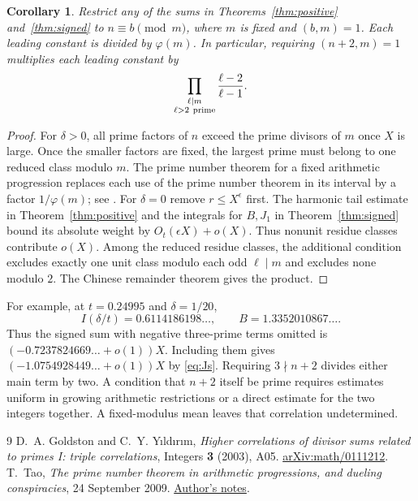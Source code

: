 \documentclass[11pt]{article}
\newtheorem{corollary}[theorem]{Corollary}
\begin{document}
\begin{corollary}\label{cor:local}
Restrict any of the sums in Theorems~\ref{thm:positive}
and~\ref{thm:signed} to \(n\equiv b\pmod m\), where \(m\) is fixed
and \((b,m)=1\). Each leading constant is divided by \(\varphi(m)\).
In particular, requiring \((n+2,m)=1\) multiplies each leading
constant by
\[
       \prod_{\substack{\ell\mid m\\\ell>2\ {\rm prime}}}
                     \frac{\ell-2}{\ell-1}.
\]
\end{corollary}
\begin{proof}
For \(\delta>0\), all prime factors of \(n\) exceed the prime divisors
of \(m\) once \(X\) is large. Once the smaller factors are fixed, the
largest prime must belong to one reduced class modulo \(m\).
The prime number theorem for a fixed arithmetic progression replaces
each use of the prime number theorem in its interval by a factor
\(1/\varphi(m)\); see \cite{Tao}. For \(\delta=0\) remove \(r\le
X^\epsilon\) first. The harmonic tail estimate in
Theorem~\ref{thm:positive} and the integrals for \(B,J_1\) in
Theorem~\ref{thm:signed} bound its absolute weight by
\(O_t(\epsilon X)+o(X)\). Thus nonunit residue classes contribute
\(o(X)\). Among the reduced residue classes, the additional
condition excludes exactly one unit class modulo each odd
\(\ell\mid m\) and excludes none modulo \(2\). The Chinese
remainder theorem gives the product.
\end{proof}

For example, at \(t=0.24995\) and \(\delta=1/20\),
\[
  I(\delta/t)=0.6114186198\ldots,\qquad
  B=1.3352010867\ldots .
\]
Thus the signed sum with negative three-prime terms omitted is
\((-0.7237824669\ldots+o(1))X\). Including them gives
\((-1.0754928449\ldots+o(1))X\) by \eqref{eq:Js}.
Requiring \(3\nmid n+2\) divides either main term by two.
A condition that \(n+2\) itself be
prime requires estimates uniform in growing arithmetic restrictions
or a direct estimate for the two integers together. A fixed-modulus
mean leaves that correlation undetermined.

\begin{thebibliography}{9}
 D.~A. Goldston and C.~Y. Y{\i}ld{\i}r{\i}m,
  \emph{Higher correlations of divisor sums related to primes I:
  triple correlations}, Integers \textbf{3} (2003), A05.
  \href{https://arxiv.org/abs/math/0111212}{arXiv:math/0111212}.
 T.~Tao, \emph{The prime number theorem in arithmetic
  progressions, and dueling conspiracies}, 24 September 2009.
  \href{https://terrytao.wordpress.com/2009/09/24/the-prime-number-theorem-in-arithmetic-progressions-and-dueling-conspiracies/}{Author's notes}.
\end{thebibliography}
\end{document}
